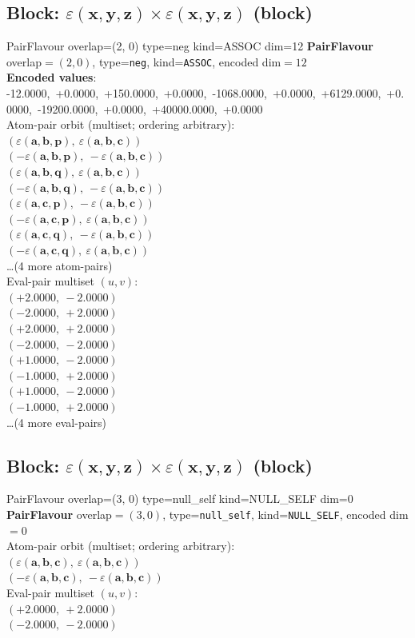 \documentclass[a4paper,11pt]{article}
\newcommand{\kblbmcpggoncpf}[3]{\varepsilon(\mathbf{#1},\mathbf{#2},\mathbf{#3})}
\begin{document}
\subsection{Block: $\kblbmcpggoncpf{x}{y}{z} \times \kblbmcpggoncpf{x}{y}{z}$  (block)}
    PairFlavour  overlap=(2, 0)  type=neg  kind=ASSOC  dim=12
\textbf{PairFlavour} overlap$=(2, 0)$, type=\texttt{neg}, kind=\texttt{ASSOC}, encoded dim$=12$\\
\textbf{      Encoded values}: -12.0000,\ +0.0000,\ +150.0000,\ +0.0000,\ -1068.0000,\ +0.0000,\ +6129.0000,\ +0.0000,\ -19200.0000,\ +0.0000,\ +40000.0000,\ +0.0000\\
\quad Atom-pair orbit (multiset; ordering arbitrary):\\
$(\kblbmcpggoncpf{a}{b}{p},\ \kblbmcpggoncpf{a}{b}{c})$\\
$(-\kblbmcpggoncpf{a}{b}{p},\ -\kblbmcpggoncpf{a}{b}{c})$\\
$(\kblbmcpggoncpf{a}{b}{q},\ \kblbmcpggoncpf{a}{b}{c})$\\
$(-\kblbmcpggoncpf{a}{b}{q},\ -\kblbmcpggoncpf{a}{b}{c})$\\
$(\kblbmcpggoncpf{a}{c}{p},\ -\kblbmcpggoncpf{a}{b}{c})$\\
$(-\kblbmcpggoncpf{a}{c}{p},\ \kblbmcpggoncpf{a}{b}{c})$\\
$(\kblbmcpggoncpf{a}{c}{q},\ -\kblbmcpggoncpf{a}{b}{c})$\\
$(-\kblbmcpggoncpf{a}{c}{q},\ \kblbmcpggoncpf{a}{b}{c})$\\
\quad \ldots (4 more atom-pairs)\\
\quad Eval-pair multiset $(u, v)$:\\
$(+2.0000,\ -2.0000)$\\
$(-2.0000,\ +2.0000)$\\
$(+2.0000,\ +2.0000)$\\
$(-2.0000,\ -2.0000)$\\
$(+1.0000,\ -2.0000)$\\
$(-1.0000,\ +2.0000)$\\
$(+1.0000,\ -2.0000)$\\
$(-1.0000,\ +2.0000)$\\
\quad \ldots (4 more eval-pairs)\\

\subsection{Block: $\kblbmcpggoncpf{x}{y}{z} \times \kblbmcpggoncpf{x}{y}{z}$  (block)}
    PairFlavour  overlap=(3, 0)  type=null\_self  kind=NULL\_SELF  dim=0
\textbf{PairFlavour} overlap$=(3, 0)$, type=\texttt{null\_self}, kind=\texttt{NULL\_SELF}, encoded dim$=0$\\
\quad Atom-pair orbit (multiset; ordering arbitrary):\\
$(\kblbmcpggoncpf{a}{b}{c},\ \kblbmcpggoncpf{a}{b}{c})$\\
$(-\kblbmcpggoncpf{a}{b}{c},\ -\kblbmcpggoncpf{a}{b}{c})$\\
\quad Eval-pair multiset $(u, v)$:\\
$(+2.0000,\ +2.0000)$\\
$(-2.0000,\ -2.0000)$\\
\end{document}
